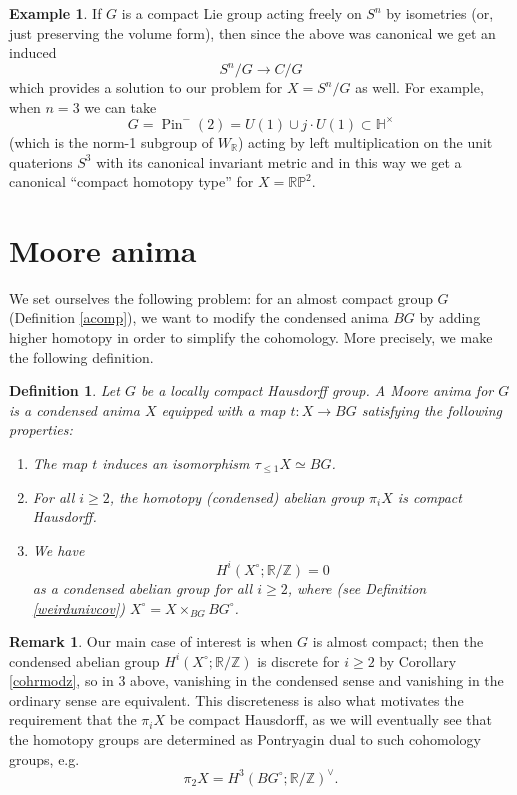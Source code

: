 \documentclass[12pt]{article}
\newtheorem{definition}[theorem]{Definition}
\theoremstyle{definition}
\newtheorem{example}[theorem]{Example}
\newtheorem{remark}[theorem]{Remark}
\newcommand{\on}{\operatorname}
\newcommand{\mbb}{\mathbb}
\begin{document}
\begin{example}
If $G$ is a compact Lie group acting freely on $S^n$ by isometries (or, just preserving the volume form), then since the above was canonical we get an induced
$$S^n/G \to C/G$$
which provides a solution to our problem for $X=S^n/G$ as well.  For example, when $n=3$ we can take
$$G = \on{Pin}^-(2) = U(1)\cup j\cdot U(1)\subset\mbb{H}^\times$$
(which is the norm-1 subgroup of $W_{\mbb{R}}$) acting by left multiplication on the unit quaterions $S^3$ with its canonical invariant metric and in this way we get a canonical ``compact homotopy type'' for $X=\mbb{R}\mbb{P}^2$.
\end{example}

\section{Moore anima}\label{mooresection}
 

We set ourselves the following problem: for an almost compact group $G$ (Definition \ref{acomp}), we want to modify the condensed anima $BG$ by adding higher homotopy in order to simplify the cohomology.  More precisely, we make the following definition.

\begin{definition}\label{moore}
Let $G$ be a locally compact Hausdorff group.  A \emph{Moore anima} for $G$ is a condensed anima $X$ equipped with a map $t: X \to BG$ satisfying the following properties:
\begin{enumerate}
\item The map $t$ induces an isomorphism $\tau_{\leq 1}X \simeq BG$.
\item For all $i\geq 2$, the homotopy (condensed) abelian group $\pi_i X$ is compact Hausdorff.
\item We have
$$H^i(X^\circ;\mbb{R}/\mbb{Z})=0$$
as a condensed abelian group for all $i\geq 2$, where (see Definition \ref{weirdunivcov}) $X^\circ=X\times_{BG}BG^\circ$.
\end{enumerate}
\end{definition}


\begin{remark}
Our main case of interest is when $G$ is almost compact; then the condensed abelian group $H^i(X^\circ;\mbb{R}/\mbb{Z})$ is discrete for $i\geq 2$ by Corollary \ref{cohrmodz}, so in 3 above, vanishing in the condensed sense and vanishing in the ordinary sense are equivalent.  This discreteness is also what motivates the requirement that the $\pi_iX$ be compact Hausdorff, as we will eventually see that the homotopy groups are determined as Pontryagin dual to such cohomology groups, e.g.\
$$\pi_2 X = H^3(BG^\circ;\mbb{R}/\mbb{Z})^\vee.$$
\end{remark}
\end{document}
